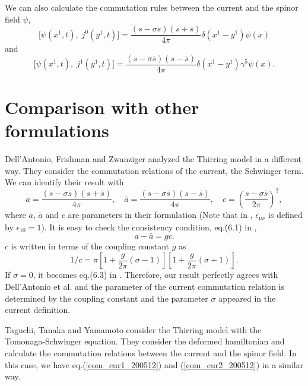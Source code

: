 \documentclass[a4paper,fleqn]{article}
\begin{document}
We can also calculate the commutation rules between the current and 
the spinor field $\psi$,
\begin{equation}
\biggl[\psi(x^1, t), \;j^0(y^1,t)\biggr] = 
\frac{(s - \sigma \bar s)(s + \bar s)}{4 \pi} \delta(x^1 - y^1) \psi(x)
\label{com_cur1_200512}
\end{equation}
and
\begin{equation}
\biggr[\psi(x^1, t), \;j^1(y^1, t)\biggr] = 
\frac{(s - \sigma \bar s)(s - \bar s)}{4 \pi} \delta(x^1 - y^1) \gamma^5 \psi(x).
\label{com_cur2_200512}
\end{equation}

\section{Comparison with other formulations}
Dell'Antonio, Frishman and Zwanziger \cite{del_fri_zwa} 
analyzed the Thirring model in a different way. They consider
the commutation relations of the current, the Schwinger term.
 We can identify their result with
\begin{equation}
a = \frac{(s - \sigma \bar s)(s + \bar s)}{4 \pi}, \quad
\bar a =  \frac{(s - \sigma \bar s)(s - \bar s)}{4 \pi}, \quad
c = \left(\frac{s - \sigma \bar s}{2 \pi} \right)^2,
\end{equation}
where $a$, $\bar{a}$ and $c$ are parameters in their formulation 
(Note that in \cite{del_fri_zwa}, $\epsilon_{\mu\nu}$ is defined by $\epsilon_{10}=1$).
It is easy to check the consistency condition, eq.(6.1) in \cite{del_fri_zwa}, 
\begin{equation}
a - \bar{a} = g c .
\end{equation}
$c$ is written in terms of the coupling constant $g$ as
\begin{equation}
 1/c = \pi \left[ 1 + \frac{g}{2 \pi} (\sigma - 1) \right]
           \left[ 1 + \frac{g}{2 \pi} (\sigma + 1) \right].
\label{c_g}
\end{equation}
If $\sigma =0$, it becomes eq.(6.3) in \cite{del_fri_zwa}. Therefore, our result 
perfectly agrees with Dell'Antonio et al. and the parameter of the current commutation relation is 
determined by the coupling constant and the parameter $\sigma$ 
appeared in  the current definition.

Taguchi, Tanaka and Yamamoto \cite{tag_tan_yam} consider the Thirring model 
with the Tomonaga-Schwinger equation. 
They consider the deformed hamiltonian and calculate the commutation relations 
between the current and the spinor field. 
In this case, we have eq.(\ref{com_cur1_200512}) and (\ref{com_cur2_200512}) 
in a similar way.
\end{document}
